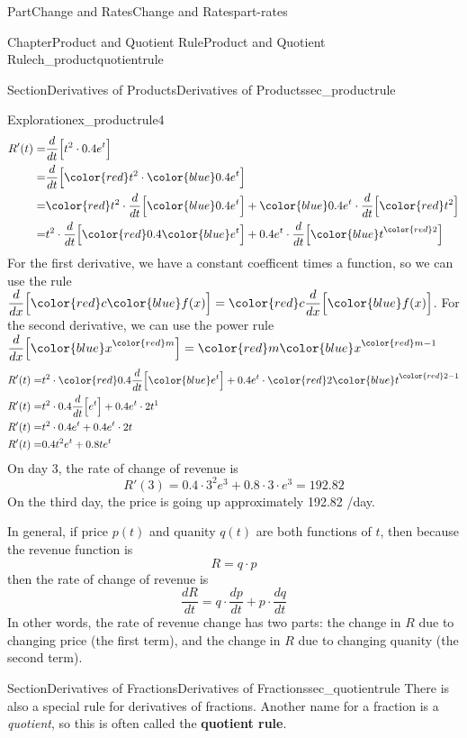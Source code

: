 \documentclass{tufte-book}
\newcommand{\terminology}[1]{\textbf{#1}}
\numberwithin{equation}{chapter}
\newcommand{\red}[1]{   {\color{red}   #1}   }
\newcommand{\blue}[1]{  {\color{blue}  #1}  }
\newcommand{\ddx}[1]{ \dfrac{d}{dx} \Big[ #1 \Big]  }
\newcommand{\ddt}[1]{ \dfrac{d}{dt} \Big[ #1 \Big]  }
\newcommand{\amp}{&}
\begin{document}
\begin{partptx}{Part}{Change and Rates}{}{Change and Rates}{}{}{part-rates}
\begin{chapterptx}{Chapter}{Product and Quotient Rule}{}{Product and Quotient Rule}{}{}{ch_productquotientrule}
\begin{sectionptx}{Section}{Derivatives of Products}{}{Derivatives of Products}{}{}{sec_productrule}
\begin{exploration}{Exploration}{}{ex_productrule4}
\begin{align*}
R'(t) = \amp \ddt{ t^2\cdot 0.4e^t } \\
= \amp \ddt{ \red{t^2}\cdot \blue{0.4e^t} } \\
= \amp \red{t^2}\cdot\ddt{  \blue{0.4e^t} } + \blue{0.4e^t}\cdot \ddt{ \red{t^2} }  \\
= \amp t^2\cdot\ddt{  \red{0.4}\blue{e^t} } + 0.4e^t \cdot \ddt{ \blue{t}^{\red{2}} }  
\end{align*}
For the first derivative, we have a constant coefficent times a function, so we can use the rule \(\ddx{\red{c}\blue{f(x)}} = \red{c} \ddx{\blue{f(x)} }\). For the second derivative, we can use the power rule \(\ddx{\blue{x}^{\red{m}}} = \red{m} \blue{x}^{\red{m}-1}\)%
\begin{align*}
R'(t) = \amp t^2\cdot \red{0.4}\ddt{ \blue{e^t} } + 0.4e^t \cdot \red{2} \blue{t}^{\red{2}-1}   \\
R'(t) = \amp t^2\cdot 0.4 \ddt{ e^t } + 0.4e^t \cdot 2 t^{1}   \\
R'(t) = \amp t^2\cdot 0.4 e^t  + 0.4e^t \cdot 2 t   \\
R'(t) = \amp 0.4 t^2 e^t  + 0.8 t e^t   
\end{align*}
On day \(3\), the rate of change of revenue is%
\begin{equation*}
R'(3) = 0.4 \cdot 3^2 e^3  + 0.8\cdot  3 \cdot e^3 = 192.82
\end{equation*}
On the third day, the price is going up approximately 192.82 \textdollar{}\slash{}day.%
\end{exploration}%
In general, if price \(p(t)\) and quanity \(q(t)\) are both functions of \(t\), then because the revenue function is%
\begin{equation*}
R = q\cdot p
\end{equation*}
then the rate of change of revenue is%
\begin{equation*}
\frac{dR}{dt} = q\cdot \frac{dp}{dt} + p \cdot \frac{dq}{dt}
\end{equation*}
In other words, the rate of revenue change has two parts: the change in \(R\) due to changing price (the first term), and the change in \(R\) due to changing quanity (the second term).%
\end{sectionptx}
%
%
\typeout{************************************************}
\typeout{************************************************}
%
\begin{sectionptx}{Section}{Derivatives of Fractions}{}{Derivatives of Fractions}{}{}{sec_quotientrule}
There is also a special rule for derivatives of fractions. Another name for a fraction is a \emph{quotient}, so this is often called the \terminology{quotient rule}.%

\end{sectionptx}
\end{chapterptx}
\end{partptx}
\end{document}
